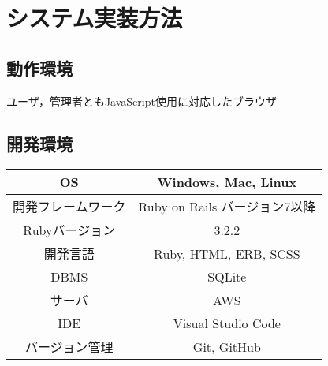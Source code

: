 \chapter{システム実装方法}
\section*{動作環境}
ユーザ，管理者ともJavaScript使用に対応したブラウザ
\section*{開発環境}
\begin{tabular}{|c|c|} \hline
	OS        & Windows, Mac, Linux     \\  \hline
	開発フレームワーク & Ruby on Rails  バージョン7以降 \\ \hline
	Rubyバージョン & 3.2.2                   \\  \hline
	開発言語      & Ruby, HTML, ERB, SCSS   \\ \hline
	DBMS      & SQLite                  \\ \hline
	サーバ       & AWS                     \\ \hline
	IDE       & Visual Studio Code      \\ \hline
	バージョン管理   & Git, GitHub             \\ \hline
\end{tabular}
